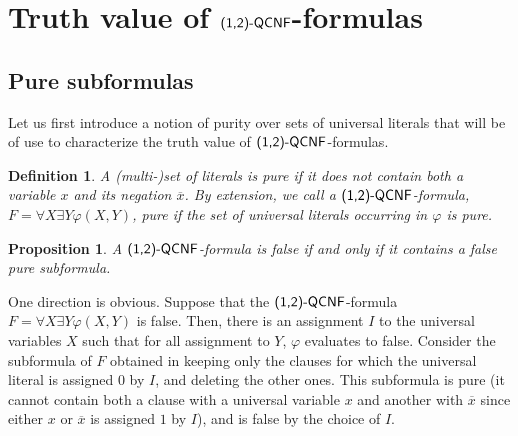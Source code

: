 \documentclass[aop,noinfoline]{imsart}
\newtheorem{proposition}[theorem]{Proposition}
\newtheorem{definition}[theorem]{Definition}
\renewcommand{\Box}{{\vrule width0.6ex height1em depth0cm}}
\newenvironment{proof}{\noindent{\bf Proof:}}{\hfill \Box}
\newcommand{\onetwo}{(1,2)}
\newcommand{\negate}[1]{\overline{#1}}
\newcommand{\onetwoqcnf}{\mbox{\sf \onetwo-QCNF}}
\begin{document}
\section{Truth value  of  $\onetwoqcnf$-formulas}\label{sec:truth_char}

 
\subsection{Pure subformulas}\label{subsec:pure}

Let us first introduce a notion of purity over sets of universal literals that will be of use to characterize the truth value  of $\onetwoqcnf$-formulas.

\begin{definition}
A (multi-)set of literals is \emph{pure} if it does not contain both a variable $x$ and its negation $\negate{x}$. 
By extension, we call a  $\onetwoqcnf$-formula, $F=\forall X \exists Y \varphi(X,Y)$, \emph{pure} if the set of universal literals occurring in $\varphi$ is pure.
\end{definition}

\begin{proposition}\label{prop:truth_char}
 A  $\onetwoqcnf$-formula is false if and only if it contains a false pure subformula.
\end{proposition}
\begin{proof}
 One direction is obvious. Suppose that the $\onetwoqcnf$-formula $F=\forall X \exists Y \varphi(X,Y)$ is false. Then, there is an assignment $I$ to the universal variables $X$ such that for all assignment to $Y$, $\varphi$ evaluates to false. Consider the subformula of $F$ obtained in keeping only the clauses for which the universal literal is assigned $0$ by $I$, and deleting the other ones. This subformula is pure (it cannot contain both a clause with a universal variable $x$ and another with $\negate{x}$ since either $x$ or $\negate{x}$ is assigned $1$ by $I$), and is false by the choice of $I$. 
\end{proof}
\medskip
\end{document}
